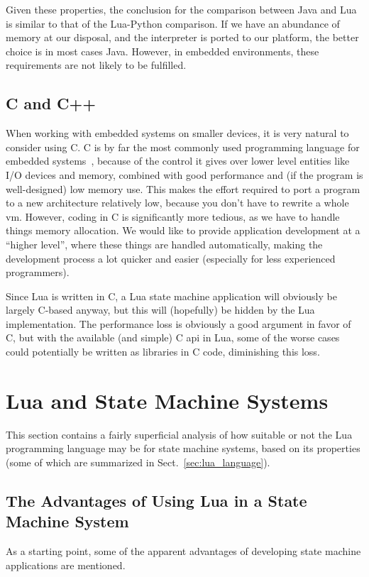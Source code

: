 Given these properties, the conclusion for the comparison between Java and Lua is similar to that of the Lua-Python comparison. If we have an abundance of memory at our disposal, and the interpreter is ported to our platform, the better choice is in most cases Java. However, in embedded environments, these requirements are not likely to be fulfilled.

\subsection{C and C++}
\label{sec:lua_vs_c}
When working with embedded systems on smaller devices, it is very natural to consider using C. C is by far the most commonly used programming language for embedded systems~\cite{phd:dunkels}, because of the control it gives over lower level entities like I/O devices and memory, combined with good performance and (if the program is well-designed) low memory use. This makes the effort required to port a program to a new architecture relatively low, because you don't have to rewrite a whole \gls{vm}. However, coding in C is significantly more tedious, as we have to handle things memory allocation. We would like to provide application development at a ``higher level'', where these things are handled automatically, making the development process a lot quicker and easier (especially for less experienced programmers).

Since Lua is written in C, a Lua state machine application will obviously be largely C-based anyway, but this will (hopefully) be hidden by the Lua implementation. The performance loss is obviously a good argument in favor of C, but with the available (and simple) C \gls{api} in Lua, some of the worse cases could potentially be written as libraries in C code, diminishing this loss.

\section{Lua and State Machine Systems}
\label{sec:lua_and_state_machines}
This section contains a fairly superficial analysis of how suitable or not the Lua programming language may be for state machine systems, based on its properties (some of which are summarized in Sect.~\ref{sec:lua_language}).

\subsection{The Advantages of Using Lua in a State Machine System}
\label{sec:lua_advantages}
As a starting point, some of the apparent advantages of developing state machine applications are mentioned.

